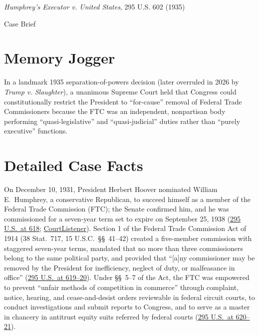 \documentclass[12pt]{article}
\begin{document}
\begin{center}
{\LARGE \textit{Humphrey's Executor v. United States}, 295 U.S. 602 (1935)\par}
\vspace{0.8em}
{\large Case Brief\par}
\end{center}
\vspace{1em}

\section{Memory Jogger}

In a landmark 1935 separation-of-powers decision (later overruled in 2026 by \textit{Trump v. Slaughter}), a unanimous Supreme Court held that Congress could constitutionally restrict the President to ``for-cause'' removal of Federal Trade Commissioners because the FTC was an independent, nonpartisan body performing ``quasi-legislative'' and ``quasi-judicial'' duties rather than ``purely executive'' functions.

\section{Detailed Case Facts}

On December 10, 1931, President Herbert Hoover nominated William E.\ Humphrey, a conservative Republican, to succeed himself as a member of the Federal Trade Commission (FTC); the Senate confirmed him, and he was commissioned for a seven-year term set to expire on September 25, 1938 (\href{https://supreme.justia.com/cases/federal/us/295/602/}{295 U.S.\ at 618}; \href{https://www.courtlistener.com/opinion/102475/humphreys-v-united-states/}{CourtListener}). Section 1 of the Federal Trade Commission Act of 1914 (38 Stat.\ 717, 15 U.S.C.\ \S\S\ 41--42) created a five-member commission with staggered seven-year terms, mandated that no more than three commissioners belong to the same political party, and provided that ``[a]ny commissioner may be removed by the President for inefficiency, neglect of duty, or malfeasance in office'' (\href{https://supreme.justia.com/cases/federal/us/295/602/}{295 U.S.\ at 619--20}). Under \S\S\ 5--7 of the Act, the FTC was empowered to prevent ``unfair methods of competition in commerce'' through complaint, notice, hearing, and cease-and-desist orders reviewable in federal circuit courts, to conduct investigations and submit reports to Congress, and to serve as a master in chancery in antitrust equity suits referred by federal courts (\href{https://supreme.justia.com/cases/federal/us/295/602/}{295 U.S.\ at 620--21}).
\end{document}
